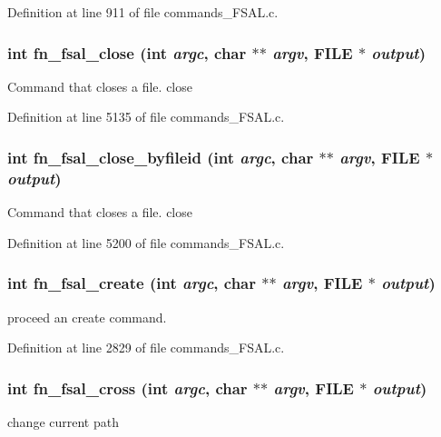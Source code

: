 Definition at line 911 of file commands\_\-FSAL.c.
\subsubsection[{fn\_\-fsal\_\-close}]{\setlength{\rightskip}{0pt plus 5cm}int fn\_\-fsal\_\-close (int {\em argc}, \/  char $\ast$$\ast$ {\em argv}, \/  FILE $\ast$ {\em output})}\label{commands__FSAL_8c_a1dfe4ba6cf12309c66972b4beb736f49}
Command that closes a file. close 

Definition at line 5135 of file commands\_\-FSAL.c.
\subsubsection[{fn\_\-fsal\_\-close\_\-byfileid}]{\setlength{\rightskip}{0pt plus 5cm}int fn\_\-fsal\_\-close\_\-byfileid (int {\em argc}, \/  char $\ast$$\ast$ {\em argv}, \/  FILE $\ast$ {\em output})}\label{commands__FSAL_8c_add966799be6a18249b7fa33d65d49ccf}
Command that closes a file. close 

Definition at line 5200 of file commands\_\-FSAL.c.
\subsubsection[{fn\_\-fsal\_\-create}]{\setlength{\rightskip}{0pt plus 5cm}int fn\_\-fsal\_\-create (int {\em argc}, \/  char $\ast$$\ast$ {\em argv}, \/  FILE $\ast$ {\em output})}\label{commands__FSAL_8c_a3bce309b30ce91cedd92062521d09b4d}
proceed an create command. 

Definition at line 2829 of file commands\_\-FSAL.c.
\subsubsection[{fn\_\-fsal\_\-cross}]{\setlength{\rightskip}{0pt plus 5cm}int fn\_\-fsal\_\-cross (int {\em argc}, \/  char $\ast$$\ast$ {\em argv}, \/  FILE $\ast$ {\em output})}\label{commands__FSAL_8c_a87895e361f769c6c2e3679db5be9ad81}
change current path 

